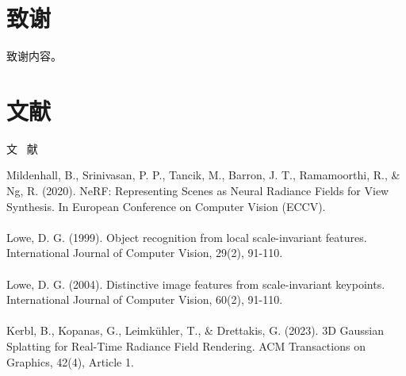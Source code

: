 \documentclass{nwputhesis}
\begin{document}
\makespace
\section{致谢}

致谢内容。

\makespace
\section*{文献}
\begin{center}
    { \blackti \fontsize{16.0600pt}{1.25}文 \, 献}
\end{center}
\noindent
Mildenhall, B., Srinivasan, P. P., Tancik, M., Barron, J. T., Ramamoorthi, R., \& Ng, R. (2020). NeRF: 
Representing Scenes as Neural Radiance Fields for View Synthesis. In European Conference on Computer Vision 
(ECCV).\\\\
Lowe, D. G. (1999). Object recognition from local scale-invariant features. International Journal of Computer Vision, 29(2), 91-110.\\\\
Lowe, D. G. (2004). Distinctive image features from scale-invariant keypoints. International Journal of Computer Vision, 60(2), 91-110.\\\\
Kerbl, B., Kopanas, G., Leimkühler, T., \& Drettakis, G. (2023). 3D Gaussian Splatting for Real-Time Radiance Field Rendering. ACM Transactions on Graphics, 42(4), Article 1. \\\\
\end{document}
